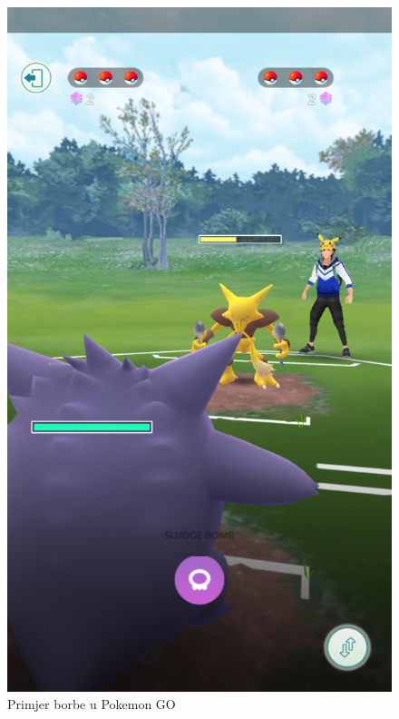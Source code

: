 		\begin{figure}[H]
			\includegraphics[scale=0.5]{slike/Slika2.2.PNG} %
			\centering
			\caption{Primjer borbe u Pokemon GO}
			\label{fig:promjene2} %
		\end{figure}
		
		
		\eject
		
	